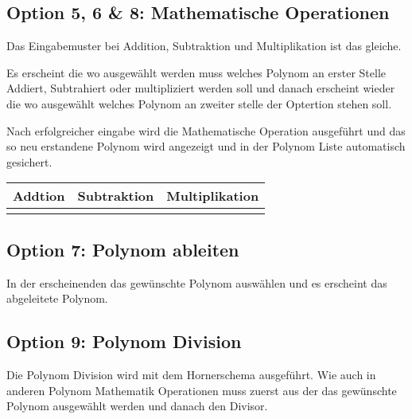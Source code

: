 \documentclass[letterpaper,10pt,ngerman]{sphinxmanual}
\begin{document}
\subsection{Option 5, 6 \& 8: Mathematische Operationen}
\label{menu:option-5-6-8-mathematische-operationen}
Das Eingabemuster bei Addition, Subtraktion und Multiplikation ist das gleiche.

Es erscheint die  wo ausgewählt werden muss welches Polynom an erster Stelle Addiert,
Subtrahiert oder multipliziert werden soll und danach erscheint wieder die  wo ausgewählt
welches Polynom an zweiter stelle der Optertion stehen soll.

Nach erfolgreicher eingabe wird die Mathematische Operation ausgeführt und das so neu erstandene Polynom
wird angezeigt und in der Polynom Liste automatisch gesichert.

\noindent\begin{tabulary}{\linewidth}{|L|L|L|}
\hline
\textsf{\relax 
Addtion
\unskip}\relax &\textsf{\relax 
Subtraktion
\unskip}\relax &\textsf{\relax 
Multiplikation
\unskip}\relax \\
\hline
\noindent{}
&
\noindent{}
&
\noindent{}
\\
\hline\end{tabulary}



\subsection{Option 7: Polynom ableiten}
\label{menu:option-7-polynom-ableiten}
\begin{DUlineblock}{0em}
\item[] In der erscheinenden  das gewünschte Polynom auswählen und es erscheint das abgeleitete Polynom.
\end{DUlineblock}



\subsection{Option 9: Polynom Division}
\label{menu:option-9-polynom-division}
Die Polynom Division wird mit dem Hornerschema ausgeführt. Wie auch in anderen Polynom Mathematik Operationen muss
zuerst aus der  das gewünschte Polynom ausgewählt werden und danach den Divisor.
\end{document}
